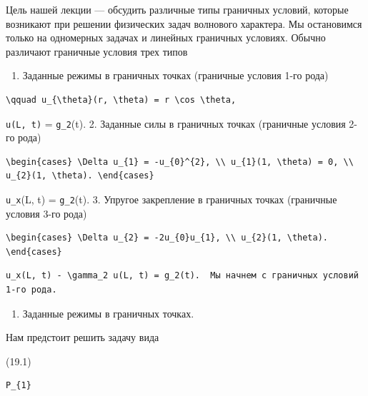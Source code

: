 \documentclass[
  ukrainian,
]{article}
\providecommand{\tightlist}{%
  \setlength{\itemsep}{0pt}\setlength{\parskip}{0pt}}
\begin{document}
Цель нашей лекции --- обсудить различные типы граничных условий, которые
возникают при решении физических задач волнового характера. Мы
остановимся только на одномерных задачах и линейных граничных условиях.
Обычно различают граничные условия трех типов

\begin{enumerate}
\def\labelenumi{\arabic{enumi}.}
\tightlist
\item
  Заданные режимы в граничных точках (граничные условия 1-го рода)
\end{enumerate}

\begin{verbatim}
\qquad u_{\theta}(r, \theta) = r \cos \theta,
\end{verbatim}

\texttt{u(L,\ t)} = \texttt{g\_2}(t). 2. Заданные силы в граничных
точках (граничные условия 2-го рода)

\begin{verbatim}
\begin{cases} \Delta u_{1} = -u_{0}^{2}, \\ u_{1}(1, \theta) = 0, \\ u_{2}(1, \theta). \end{cases}
\end{verbatim}

\texttt{u\_x}(L, t) = \texttt{g\_2}(t). 3. Упругое закрепление в
граничных точках (граничные условия 3-го рода)

\begin{verbatim}
\begin{cases} \Delta u_{2} = -2u_{0}u_{1}, \\ u_{2}(1, \theta). \end{cases}
\end{verbatim}

\begin{verbatim}
u_x(L, t) - \gamma_2 u(L, t) = g_2(t).  Мы начнем с граничных условий 1-го рода.
\end{verbatim}

\begin{enumerate}
\def\labelenumi{\arabic{enumi}.}
\tightlist
\item
  Заданные режимы в граничных точках.
\end{enumerate}

Нам предстоит решить задачу вида

(19.1)

\begin{verbatim}
P_{1}
\end{verbatim}
\end{document}
